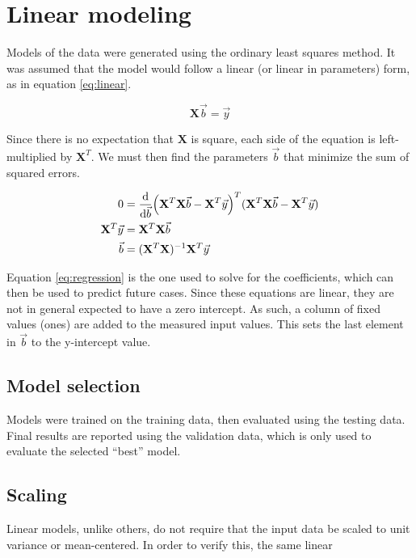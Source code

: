\documentclass{article}
\begin{document}
\section{Linear modeling}

Models of the data were generated using the ordinary least squares method. It was assumed that the model would follow a linear (or linear in parameters) form, as in equation \ref{eq:linear}.

\begin{equation}
	\mathbf{X} \vec{b} = \vec{y}
	\label{eq:linear}
\end{equation}

Since there is no expectation that $\mathbf{X}$ is square, each side of the equation is left-multiplied by $\mathbf{X}^T$. We must then find the parameters $\vec{b}$ that minimize the sum of squared errors.

\begin{align}
0 &= \dv{\vec{b}} (\mathbf{X}^T \mathbf{X} \vec{b} - \mathbf{X}^T \vec{y})^T (\mathbf{X}^T \mathbf{X} \vec{b} - \mathbf{X}^T \vec{y}) \\
\mathbf{X}^T \vec{y} &= \mathbf{X}^T \mathbf{X} \vec{b} \\
\vec{b} &= (\mathbf{X}^T \mathbf{X})^{-1} \mathbf{X}^T \vec{y} \label{eq:regression}
\end{align}

Equation \ref{eq:regression} is the one used to solve for the coefficients, which can then be used to predict future cases. Since these equations are linear, they are not in general expected to have a zero intercept. As such, a column of fixed values (ones) are added to the measured input values. This sets the last element in $\vec{b}$ to the y-intercept value.

\subsection{Model selection}

Models were trained on the training data, then evaluated using the testing data. Final results are reported using the validation data, which is only used to evaluate the selected ``best'' model.

\subsection{Scaling}

Linear models, unlike others, do not require that the input data be scaled to unit variance or mean-centered. In order to verify this, the same linear
\end{document}
